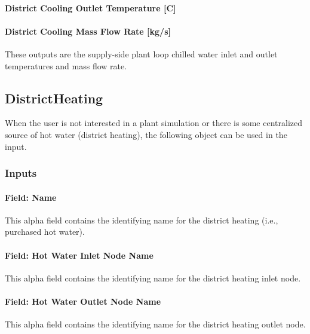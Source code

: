 \paragraph{District Cooling Outlet Temperature {[}C{]}}\label{district-cooling-outlet-temperature-c}

\paragraph{District Cooling Mass Flow Rate {[}kg/s{]}}\label{district-cooling-mass-flow-rate-kgs}

These outputs are the supply-side plant loop chilled water inlet and outlet temperatures and mass flow rate.

\subsection{DistrictHeating}\label{districtheating}

When the user is not interested in a plant simulation or there is some centralized source of hot water (district heating), the following object can be used in the input.

\subsubsection{Inputs}\label{inputs-17-006}

\paragraph{Field: Name}\label{field-name-16-006}

This alpha field contains the identifying name for the district heating (i.e., purchased hot water).

\paragraph{Field: Hot Water Inlet Node Name}\label{field-hot-water-inlet-node-name-2}

This alpha field contains the identifying name for the district heating inlet node.

\paragraph{Field: Hot Water Outlet Node Name}\label{field-hot-water-outlet-node-name-2}

This alpha field contains the identifying name for the district heating outlet node.

